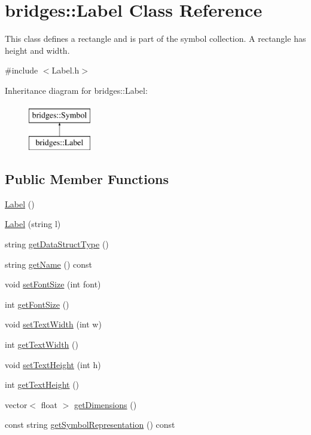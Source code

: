 \hypertarget{classbridges_1_1_label}{}\section{bridges\+:\+:Label Class Reference}
\label{classbridges_1_1_label}


This class defines a rectangle and is part of the symbol collection. A rectangle has height and width.  




{\ttfamily \#include $<$Label.\+h$>$}

Inheritance diagram for bridges\+:\+:Label\+:\begin{figure}[H]
\begin{center}
\leavevmode
\includegraphics[height=2.000000cm]{classbridges_1_1_label}
\end{center}
\end{figure}
\subsection*{Public Member Functions}
\begin{DoxyCompactItemize}
\item 
\hyperlink{classbridges_1_1_label_a6ecba5526127d5ed4d37bb38da560cc8}{Label} ()
\item 
\hyperlink{classbridges_1_1_label_a339ddf0650b3e2aa7383ab58cb61e8fa}{Label} (string l)
\item 
string \hyperlink{classbridges_1_1_label_a737053b6e94767959572f9985ea375c8}{get\+Data\+Struct\+Type} ()
\item 
string \hyperlink{classbridges_1_1_label_a7c3c7225b440bb5d8de5d65b3b1cc34b}{get\+Name} () const 
\item 
void \hyperlink{classbridges_1_1_label_aee9777172a46b4b2e099a4d1e317b6c1}{set\+Font\+Size} (int font)
\item 
int \hyperlink{classbridges_1_1_label_a630528ede3c5cc77548aeec886b92c1c}{get\+Font\+Size} ()
\item 
void \hyperlink{classbridges_1_1_label_ae7fc3629c3e1d18ceec6d96a9fa1f3a6}{set\+Text\+Width} (int w)
\item 
int \hyperlink{classbridges_1_1_label_ae5259108e1d7c9aa63475a356e9759b7}{get\+Text\+Width} ()
\item 
void \hyperlink{classbridges_1_1_label_a0f12dc8d5530ae4c66e2be4974284d2b}{set\+Text\+Height} (int h)
\item 
int \hyperlink{classbridges_1_1_label_a65746c9728f3b4e0c4b5c4d9ab0d4ee1}{get\+Text\+Height} ()
\item 
vector$<$ float $>$ \hyperlink{classbridges_1_1_label_a97d5638f629edbd6733b8f8572ca42ba}{get\+Dimensions} ()
\item 
const string \hyperlink{classbridges_1_1_label_ad4337ed91176b1911e6181f60f458a84}{get\+Symbol\+Representation} () const 
\end{DoxyCompactItemize}

